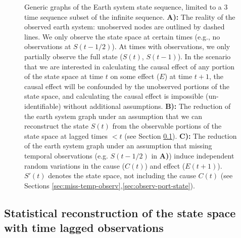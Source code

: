 \documentclass[12pt]{article}
\begin{document}
\begin{figure}
  
  \caption{Generic graphs of the Earth system state sequence, limited
    to a 3 time sequence subset of the infinite sequence. \textbf{A):}
    The reality of the observed earth system: unobserved nodes are
    outlined by dashed lines. We only observe the state space at
    certain times (e.g., no observations at $S(t-1/2)$). At times with
    observations, we only partially observe the full state ($S(t)$,
    $S(t-1)$). In the scenario that we are interested in calculating
    the causal effect of any portion of the state space at time $t$ on
    some effect ($E$) at time $t+1$, the causal effect will be
    confounded by the unobserved portions of the state space, and
    calculating the causal effect is impossible (un-identifiable)
    without additional assumptions. \textbf{B):} The reduction of the
    earth system graph under an assumption that we can reconstruct the
    state $S(t)$ from the observable portions of the state space at
    lagged times $< t$ (see Section
    \ref{sec:stat-reconstr-state}). \textbf{C):} The reduction of the
    earth system graph under an assumption that missing temporal
    observations (e.g. $S(t-1/2)$ in \textbf{A)}) induce independent
    random variations in the cause ($C(t)$) and effect
    ($E(t+1)$). $S'(t)$ denotes the state space, not including the
    cause $C(t)$ (see Sections
    \ref{sec:miss-temp-observ},\ref{sec:observ-port-state}).}
  \label{fig:generic}
\end{figure}

\subsection{Statistical reconstruction of the state space with time
  lagged observations}
\label{sec:stat-reconstr-state}
\end{document}
